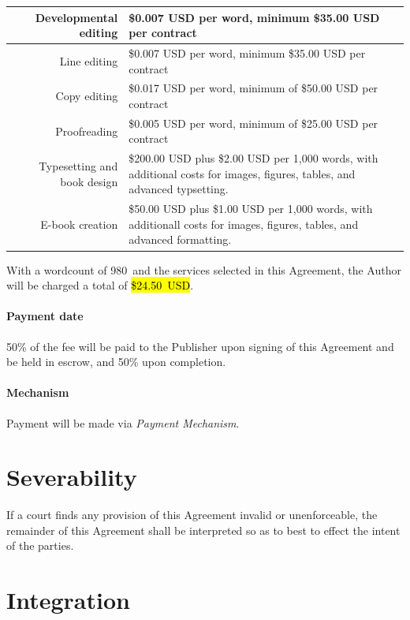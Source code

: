 \documentclass[12pt,letterpaper,oneside]{article}
\def\WordCount{980} %
\def\Fee{\$24.50 USD} %
\def\PaymentMechanism{\emph{Payment Mechanism}} %
\newcommand{\NB}[1]{\todo[linecolor=blue,backgroundcolor=blue!25,bordercolor=blue]{#1}}
\begin{document}
\begin{tabular}{| r | p{4in} |}
  \hline
  Developmental editing & \$0.007 USD per word, minimum \$35.00 USD per contract \\
  \hline
  Line editing & \$0.007 USD per word, minimum \$35.00 USD per contract \\
  \hline
  Copy editing & \$0.017 USD per word, minimum of \$50.00 USD per contract \\
  \hline
  Proofreading & \$0.005 USD per word, minimum of \$25.00 USD per contract \\
  \hline
  Typesetting and book design & \$200.00 USD plus \$2.00 USD per 1,000 words, with additional costs for images, figures, tables, and advanced typsetting. \\
  \hline
  E-book creation & \$50.00 USD plus \$1.00 USD per 1,000 words, with additionall costs for images, figures, tables, and advanced formatting. \\
  \hline
\end{tabular}

With a wordcount of \WordCount\ and the services selected in this Agreement, the Author will be charged a total of \hl{\mbox{\Fee}}.

\paragraph{Payment date}

50\% of the fee will be paid to the Publisher upon signing of this Agreement and be held in escrow, and 50\% upon completion.

\paragraph{Mechanism}

Payment will be made via \PaymentMechanism\NB{Please specify.}.

\section{Severability}

If a court finds any provision of this Agreement invalid or unenforceable, the remainder of this Agreement shall be interpreted so as to best to effect the intent of the parties.

\section{Integration}
\end{document}
